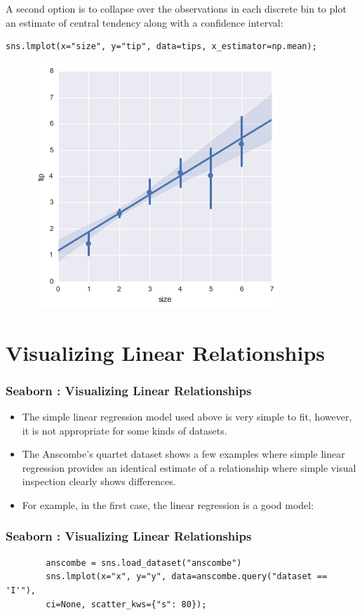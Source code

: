 \documentclass{beamer}
\begin{document}
\begin{frame}[fragile]
	\large
A second option is to collapse over the observations in each discrete bin to plot an estimate of central tendency along with a confidence interval:
\begin{verbatim}
sns.lmplot(x="size", y="tip", data=tips, x_estimator=np.mean);
\end{verbatim}

\begin{figure}
\centering
\includegraphics[width=0.7\linewidth]{images/regression_16_0}
\caption{}
\label{fig:regression_16_0}
\end{figure}


\end{frame}
\section{Visualizing Linear Relationships}
\begin{frame}
	\frametitle{Seaborn : Visualizing Linear Relationships}
	\large
	\begin{itemize}
		\item The simple linear regression model used above is very simple to fit, however, it is not appropriate for some kinds of datasets. 
		\item The Anscombe’s quartet dataset shows a few examples where simple linear regression provides an identical estimate of a relationship where simple visual inspection clearly shows differences. 
		\item For example, in the first case, the linear regression is a good model:
	\end{itemize}
\end{frame}
\begin{frame}[fragile]
	\frametitle{Seaborn : Visualizing Linear Relationships}
	\large
	\begin{framed}
		\begin{verbatim}
		anscombe = sns.load_dataset("anscombe")
		sns.lmplot(x="x", y="y", data=anscombe.query("dataset == 'I'"),
		ci=None, scatter_kws={"s": 80});
		\end{verbatim}
	\end{framed}
\end{frame}
\end{document}
